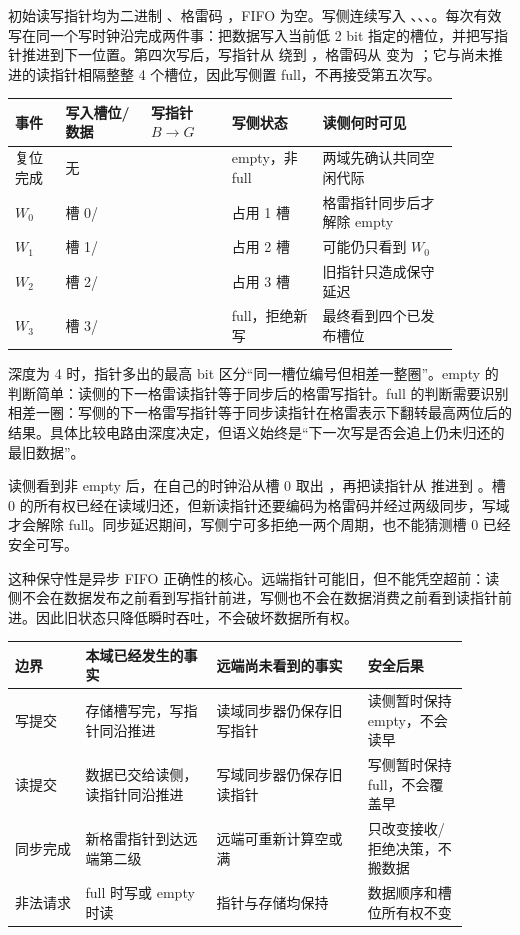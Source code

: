 初始读写指针均为二进制 、格雷码 ，FIFO 为空。写侧连续写入 、、、。每次有效写在同一个写时钟沿完成两件事：把数据写入当前低 2 bit 指定的槽位，并把写指针推进到下一位置。第四次写后，写指针从  绕到 ，格雷码从  变为 ；它与尚未推进的读指针相隔整整 4 个槽位，因此写侧置 full，不再接受第五次写。

\begin{longtable}{L{0.10\linewidth}L{0.17\linewidth}L{0.16\linewidth}L{0.18\linewidth}L{0.27\linewidth}}
\toprule
事件 & 写入槽位/数据 & 写指针 $B\to G$ & 写侧状态 & 读侧何时可见 \\
\midrule
复位完成 & 无 &  & empty，非 full & 两域先确认共同空闲代际 \\
$W_0$ & 槽 0/ &  & 占用 1 槽 & 格雷指针同步后才解除 empty \\\tablerowrule
$W_1$ & 槽 1/ &  & 占用 2 槽 & 可能仍只看到 $W_0$ \\\tablerowrule
$W_2$ & 槽 2/ &  & 占用 3 槽 & 旧指针只造成保守延迟 \\\tablerowrule
$W_3$ & 槽 3/ &  & full，拒绝新写 & 最终看到四个已发布槽位 \\
\bottomrule
\end{longtable}

深度为 4 时，指针多出的最高 bit 区分“同一槽位编号但相差一整圈”。empty 的判断简单：读侧的下一格雷读指针等于同步后的格雷写指针。full 的判断需要识别相差一圈：写侧的下一格雷写指针等于同步读指针在格雷表示下翻转最高两位后的结果。具体比较电路由深度决定，但语义始终是“下一次写是否会追上仍未归还的最旧数据”。


读侧看到非 empty 后，在自己的时钟沿从槽 0 取出 ，再把读指针从  推进到 。槽 0 的所有权已经在读域归还，但新读指针还要编码为格雷码并经过两级同步，写域才会解除 full。同步延迟期间，写侧宁可多拒绝一两个周期，也不能猜测槽 0 已经安全可写。

这种保守性是异步 FIFO 正确性的核心。远端指针可能旧，但不能凭空超前：读侧不会在数据发布之前看到写指针前进，写侧也不会在数据消费之前看到读指针前进。因此旧状态只降低瞬时吞吐，不会破坏数据所有权。

\begin{longtable}{L{0.14\linewidth}L{0.26\linewidth}L{0.30\linewidth}L{0.20\linewidth}}
\toprule
边界 & 本域已经发生的事实 & 远端尚未看到的事实 & 安全后果 \\
\midrule
写提交 & 存储槽写完，写指针同沿推进 & 读域同步器仍保存旧写指针 & 读侧暂时保持 empty，不会读早 \\\tablerowrule
读提交 & 数据已交给读侧，读指针同沿推进 & 写域同步器仍保存旧读指针 & 写侧暂时保持 full，不会覆盖早 \\\tablerowrule
同步完成 & 新格雷指针到达远端第二级 & 远端可重新计算空或满 & 只改变接收/拒绝决策，不搬数据 \\\tablerowrule
非法请求 & full 时写或 empty 时读 & 指针与存储均保持 & 数据顺序和槽位所有权不变 \\
\bottomrule
\end{longtable}

